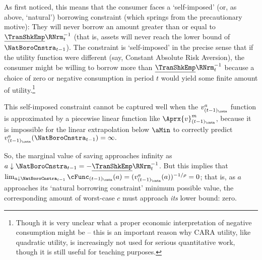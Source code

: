 As \cite{zeldesStochastic} first noticed, this means that the consumer faces a `self-imposed' (or, as above, `natural') borrowing constraint (which springs from the precautionary motive): They will never borrow an amount greater than or equal to $\underline{\TranShkEmp}\RNrm_{t}^{-1}$ (that is, assets will never reach the lower bound of $\NatBoroCnstra_{t-1}$).  The constraint is `self-imposed' in the precise sense that if the utility function were different (say, Constant Absolute Risk Aversion), the consumer might be willing to borrow more than $\underline{\TranShkEmp}\RNrm_{t}^{-1}$ because a choice of zero or negative consumption in period $t$ would yield some finite amount of utility.\footnote{Though it is very unclear what a proper economic interpretation of negative consumption might be -- this is an important reason why CARA utility, like quadratic utility, is increasingly not used for serious quantitative work, though it is still useful for teaching purposes.}

This self-imposed constraint cannot be captured well when the $v^{a}_{(t-1)_\cntn}$ function is approximated by a piecewise linear function like $\Aprx{v}^{m}_{(t-1)_\cntn}$, because it is impossible for the linear extrapolation below $\aMin$ to correctly predict $v^{a}_{(t-1)_\cntn}(\NatBoroCnstra_{t-1})=\infty.$ %


So, the marginal value of saving approaches infinity as $a \downarrow \NatBoroCnstra_{t-1}=-\underline{\TranShkEmp}\RNrm_{t}^{-1}$.  But this implies that $\lim_{a \downarrow \NatBoroCnstra_{t-1}} \cFunc_{(t-1)_\cntn}(a) = (v^{a}_{(t-1)_\cntn}(a))^{-1/\rho} = 0$; that is, as $a$ approaches its `natural borrowing constraint' minimum possible value, the corresponding amount of worst-case $c$ must approach \textit{its} lower bound: zero.

